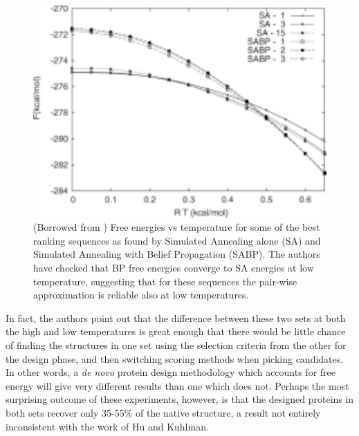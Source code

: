 \begin{figure}[h]
	\center
	\includegraphics{BP_vs_SA}
	\caption{(Borrowed from \cite{Sciretti:2008p361}) Free energies vs temperature for some of the best ranking sequences as found by Simulated Annealing alone (SA) and Simulated Annealing with Belief Propagation (SABP). The authors have checked that BP free energies converge to SA energies at low temperature, suggesting that for these sequences the pair-wise approximation is reliable also at low temperatures.}
	\label{fig:BP_vs_SA}
\end{figure}

In fact, the authors point out that the difference between these two sets at both the high and low temperatures is great enough that there would be little chance of finding the structures in one set using the selection criteria from the other for the design phase, and then switching scoring methods when picking candidates. In other words, a \emph{de novo} protein design methodology which accounts for free energy will give very different results than one which does not. Perhaps the most surprising outcome of these experiments, however, is that the designed proteins in both sets recover only 35-55\% of the native structure, a result not entirely inconsistent with the work of Hu and Kuhlman.